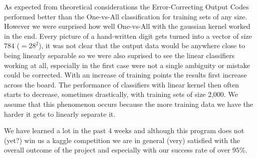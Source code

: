 \smallskip
As expected from theoretical considerations the Error-Correcting Output Codes performed better than the One-vs-All classification for training sets of any size. However we were surprised how well One-vs-All with the gaussian kernel worked in the end. Every picture of a hand-written digit gets turned into a vector of size $784$  ($=28^2$), it was not clear that the output data would be anywhere close to being linearly separable so we were also suprised to see the linear classifiers working at all, especially in the first case were not a single ambiguity or mistake could be corrected. With an increase of training points the results first increase across the board. The performance of classifiers with linear kernel then often starts to decrease, sometimes drastically, with training sets of size 2,000. We assume that this phenomenon occurs because the more training data we have the harder it gets to linearly separate it. 



We have learned a lot in the past 4 weeks and although this program does not (yet?) win us a kaggle competition we are in general (very) satisfied with the overall outcome of the project and especially with our success rate of over $95$\%.
